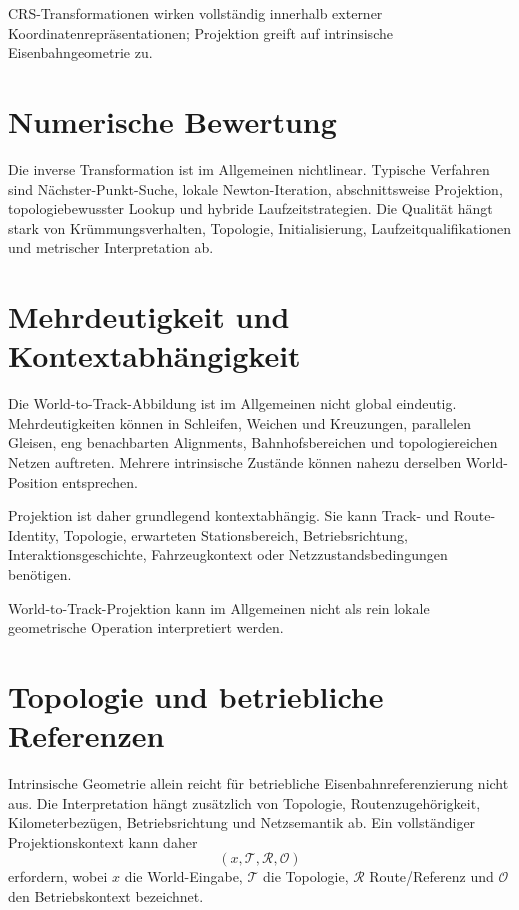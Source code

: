 CRS-Transformationen wirken vollständig innerhalb externer
Koordinatenrepräsentationen; Projektion greift auf intrinsische
Eisenbahngeometrie zu.

\section{Numerische Bewertung}

Die inverse Transformation ist im Allgemeinen nichtlinear. Typische Verfahren
sind Nächster-Punkt-Suche, lokale Newton-Iteration, abschnittsweise Projektion,
topologiebewusster Lookup und hybride Laufzeitstrategien. Die Qualität hängt
stark von Krümmungsverhalten, Topologie, Initialisierung,
Laufzeitqualifikationen und metrischer Interpretation ab.

\section{Mehrdeutigkeit und Kontextabhängigkeit}

Die World-to-Track-Abbildung ist im Allgemeinen nicht global eindeutig.
Mehrdeutigkeiten können in Schleifen, Weichen und Kreuzungen, parallelen
Gleisen, eng benachbarten Alignments, Bahnhofsbereichen und topologiereichen
Netzen auftreten. Mehrere intrinsische Zustände können nahezu derselben
World-Position entsprechen.

Projektion ist daher grundlegend kontextabhängig. Sie kann Track- und
Route-Identity, Topologie, erwarteten Stationsbereich, Betriebsrichtung,
Interaktionsgeschichte, Fahrzeugkontext oder Netzzustandsbedingungen
benötigen.

\begin{principle}[Projektionsmehrdeutigkeitsprinzip]
\label{princ:projection-ambiguity}
World-to-Track-Projektion kann im Allgemeinen nicht als rein lokale
geometrische Operation interpretiert werden.
\end{principle}

\section{Topologie und betriebliche Referenzen}

Intrinsische Geometrie allein reicht für betriebliche Eisenbahnreferenzierung
nicht aus. Die Interpretation hängt zusätzlich von Topologie,
Routenzugehörigkeit, Kilometerbezügen, Betriebsrichtung und Netzsemantik ab.
Ein vollständiger Projektionskontext kann daher
\[
(x,\mathcal T,\mathcal R,\mathcal O)
\]
erfordern, wobei \(x\) die World-Eingabe, \(\mathcal T\) die Topologie,
\(\mathcal R\) Route/Referenz und \(\mathcal O\) den Betriebskontext
bezeichnet.

